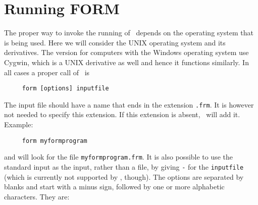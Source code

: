 \chapter{Running FORM}
\label{running}

The proper way to invoke the running of \FORM\ depends on 
the operating system that is being used. Here we will consider the 
UNIX operating system and its derivatives. The version for 
computers with the Windows operating system use Cygwin, which 
is a UNIX derivative as well and hence it functions similarly. In all cases 
a proper call of \FORM\ is
\begin{verbatim}
     form [options] inputfile
\end{verbatim}
The input file should have a name that ends in the 
extension \verb:.frm:. It is however not needed to specify this extension. 
If this extension is absent, \FORM\ will add it. Example:
\begin{verbatim}
     form myformprogram
\end{verbatim}
and \FORM{} will look for the file \verb:myformprogram.frm:. 
It is also possible to use the standard input as the input, rather than a file, 
by giving \verb:-: for the \verb:inputfile: (which is currently not supported by \ParFORM{}, though). 
The options are 
separated by blanks and start with a minus sign, followed by one or more 
alphabetic characters. They are:
